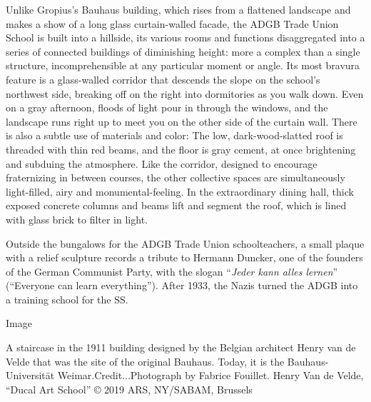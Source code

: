 Unlike Gropius's Bauhaus building, which rises from a flattened
landscape and makes a show of a long glass curtain-walled facade, the
ADGB Trade Union School is built into a hillside, its various rooms and
functions disaggregated into a series of connected buildings of
diminishing height: more a complex than a single structure,
incomprehensible at any particular moment or angle. Its most bravura
feature is a glass-walled corridor that descends the slope on the
school's northwest side, breaking off on the right into dormitories as
you walk down. Even on a gray afternoon, floods of light pour in through
the windows, and the landscape runs right up to meet you on the other
side of the curtain wall. There is also a subtle use of materials and
color: The low, dark-wood-slatted roof is threaded with thin red beams,
and the floor is gray cement, at once brightening and subduing the
atmosphere. Like the corridor, designed to encourage fraternizing in
between courses, the other collective spaces are simultaneously
light-filled, airy and monumental-feeling. In the extraordinary dining
hall, thick exposed concrete columns and beams lift and segment the
roof, which is lined with glass brick to filter in light.

Outside the bungalows for the ADGB Trade Union schoolteachers, a small
plaque with a relief sculpture records a tribute to Hermann Duncker, one
of the founders of the German Communist Party, with the slogan
``\emph{Jeder kann alles lernen}'' (``Everyone can learn everything'').
After 1933, the Nazis turned the ADGB into a training school for the SS.

Image

A staircase in the 1911 building designed by the Belgian architect Henry
van de Velde that was the site of the original Bauhaus. Today, it is the
Bauhaus-Universität Weimar.Credit...Photograph by Fabrice Fouillet.
Henry Van de Velde, ``Ducal Art School'' © 2019 ARS, NY/SABAM, Brussels

